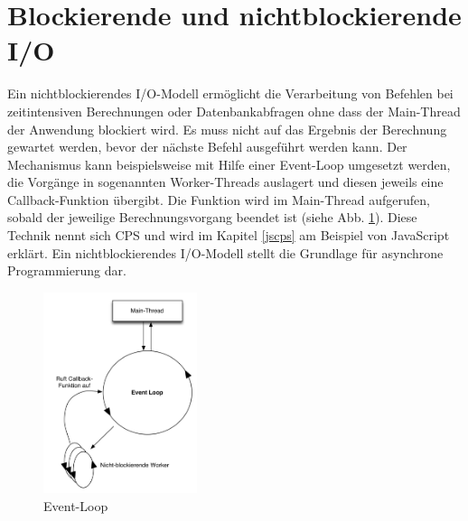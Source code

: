 \section{Blockierende und nichtblockierende \acs{I/O}}
 \label{nonblocking}Ein nichtblockierendes I/O-Modell ermöglicht die Verarbeitung von Befehlen bei zeitintensiven Berechnungen oder Datenbankabfragen ohne dass der Main-Thread der Anwendung blockiert wird. Es muss nicht auf das Ergebnis der Berechnung gewartet werden, bevor der nächste Befehl ausgeführt werden kann. Der Mechanismus kann beispielsweise mit Hilfe einer Event-Loop umgesetzt werden, die Vorgänge in sogenannten Worker-Threads auslagert und diesen jeweils eine Callback-Funktion übergibt. Die Funktion wird im Main-Thread aufgerufen, sobald der jeweilige Berechnungsvorgang beendet ist (siehe Abb. \ref{img:nonblocking}). Diese Technik nennt sich \acf{CPS} und wird im Kapitel \ref{jscps} am Beispiel von JavaScript erklärt. Ein nichtblockierendes I/O-Modell stellt die Grundlage für asynchrone Programmierung dar.
\begin{figure}[H]
\centering
\includegraphics[width=0.4\textwidth]{images/nonblocking.png}
\caption[Event-Loop]{Event-Loop}
\label{img:nonblocking}
\end{figure}
\acresetall
